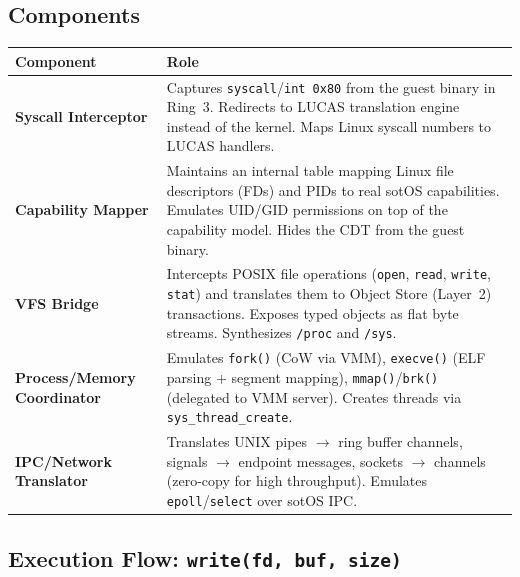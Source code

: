 \documentclass[11pt,a4paper]{article}
\begin{document}
\subsection{Components}

\begin{center}
\begin{tabularx}{\textwidth}{lX}
\toprule
\textbf{Component} & \textbf{Role} \\
\midrule
\textbf{Syscall Interceptor} &
  Captures \texttt{syscall}/\texttt{int 0x80} from the guest binary in Ring~3.
  Redirects to LUCAS translation engine instead of the kernel.
  Maps Linux syscall numbers to LUCAS handlers. \\
\midrule
\textbf{Capability Mapper} &
  Maintains an internal table mapping Linux file descriptors (FDs) and PIDs
  to real sotOS capabilities. Emulates UID/GID permissions on top of the
  capability model. Hides the CDT from the guest binary. \\
\midrule
\textbf{VFS Bridge} &
  Intercepts POSIX file operations (\texttt{open}, \texttt{read}, \texttt{write}, \texttt{stat})
  and translates them to Object Store (Layer~2) transactions.
  Exposes typed objects as flat byte streams. Synthesizes \texttt{/proc} and \texttt{/sys}. \\
\midrule
\textbf{Process/Memory Coordinator} &
  Emulates \texttt{fork()} (CoW via VMM), \texttt{execve()} (ELF parsing + segment mapping),
  \texttt{mmap()}/\texttt{brk()} (delegated to VMM server).
  Creates threads via \texttt{sys\_thread\_create}. \\
\midrule
\textbf{IPC/Network Translator} &
  Translates UNIX pipes $\rightarrow$ ring buffer channels,
  signals $\rightarrow$ endpoint messages,
  sockets $\rightarrow$ channels (zero-copy for high throughput).
  Emulates \texttt{epoll}/\texttt{select} over sotOS IPC. \\
\bottomrule
\end{tabularx}
\end{center}

\subsection{Execution Flow: \texttt{write(fd, buf, size)}}
\end{document}
